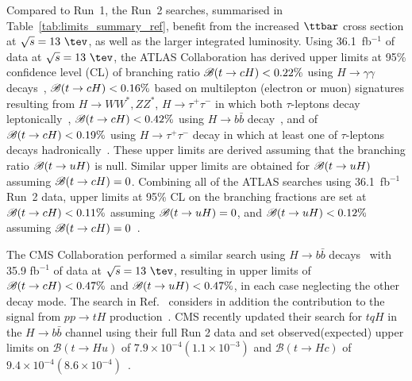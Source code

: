 Compared to Run~1, the Run~2 searches, summarised in Table~\ref{tab:limits_summary_ref}, benefit from the increased $\ttbar$ cross section at $\sqrt{s}=13~\tev$, as well as the larger integrated luminosity.
Using 36.1~fb$^{-1}$ of data at $\sqrt{s}=13~\tev$, the ATLAS Collaboration has derived upper limits at 95\% confidence level (CL) of branching ratio
$\mathscr{B}(t\to cH)<0.22\%$ using $H\to \gamma\gamma$ decays~\cite{Aaboud:2017mfd}, $\mathscr{B}(t\to cH)<0.16\%$ based on
multilepton (electron or muon) signatures resulting from 
$H \to  WW^*, ZZ^*$, $H\to \tau^+\tau^-$ in which both $\tau$-leptons decay leptonically~\cite{Aaboud:2018pob},
$\mathscr{B}(t\to cH)<0.42\%$ using $H\to b\bar{b}$ decay~\cite{fcnc36}, and of $\mathscr{B}(t\to cH)<0.19\%$ using $H\to \tau^+\tau^-$ decay in which at least
one of $\tau$-leptons decays hadronically~\cite{fcnc36}.  
These upper limits are derived assuming that the branching ratio $\mathscr{B}(t\to uH)$ is null. Similar upper limits are obtained for $\mathscr{B}(t\to uH)$ assuming $\mathscr{B}(t\to cH)=0$.
Combining all of the ATLAS searches using 36.1~fb$^{-1}$ Run~2 data, upper limits at 95\% CL on the branching fractions are 
set at $\mathscr{B}(t\to cH)<0.11\%$ assuming $\mathscr{B}(t\to uH)=0$, and $\mathscr{B}(t\to uH)<0.12\%$ assuming $\mathscr{B}(t\to cH)=0$~\cite{fcnc36}.

The CMS Collaboration performed a similar search using  
$H\to b\bar{b}$ decays~\cite{Sirunyan:2017uae} with 35.9 fb$^{-1}$ of data at $\sqrt{s}=13~\tev$, resulting 
in upper limits of $\mathscr{B}(t\to cH)<0.47\%$ and $\mathscr{B}(t\to uH)<0.47\%$, in each case neglecting the other decay mode.
The search in Ref.~\cite{Sirunyan:2017uae} considers in addition the contribution to the signal from 
$pp \to tH$ production~\cite{Greljo:2014dka}. 
CMS recently updated their search for $tqH$ in the $H\to b\bar{b}$ channel using
their full Run 2 data and  set observed(expected) upper limits on $\mathcal{B}(t\to Hu)$ of $7.9\times10^{-4}(1.1\times10^{-3})$ and $\mathcal{B}(t\to Hc)$ of $9.4\times10^{-4}(8.6\times10^{-4})$~\cite{CMS:2021gfa}.


